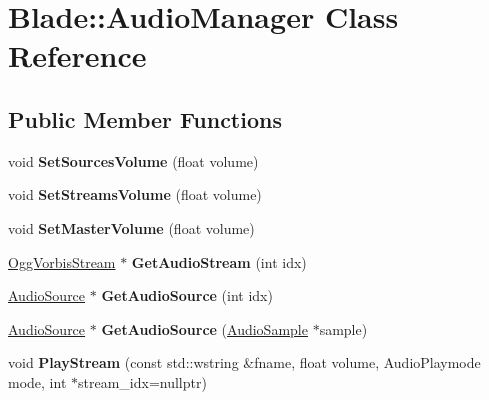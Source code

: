 \hypertarget{class_blade_1_1_audio_manager}{}\section{Blade\+:\+:Audio\+Manager Class Reference}
\label{class_blade_1_1_audio_manager}
\subsection*{Public Member Functions}
\begin{DoxyCompactItemize}
\item 
\mbox{\label{class_blade_1_1_audio_manager_a1106ccc2bbab55f49024eb5502d10683}} 
void {\bfseries Set\+Sources\+Volume} (float volume)
\item 
\mbox{\label{class_blade_1_1_audio_manager_a3d3199ddf491cc32f41e8d3252485176}} 
void {\bfseries Set\+Streams\+Volume} (float volume)
\item 
\mbox{\label{class_blade_1_1_audio_manager_acb30e9b4b523989514703d943e659f92}} 
void {\bfseries Set\+Master\+Volume} (float volume)
\item 
\mbox{\label{class_blade_1_1_audio_manager_abbea9e3d1d332c983b86d8a2eea926b4}} 
\hyperlink{class_blade_1_1_ogg_vorbis_stream}{Ogg\+Vorbis\+Stream} $\ast$ {\bfseries Get\+Audio\+Stream} (int idx)
\item 
\mbox{\label{class_blade_1_1_audio_manager_a3956140c9454c2d41adeaf5f0e15d455}} 
\hyperlink{class_blade_1_1_audio_source}{Audio\+Source} $\ast$ {\bfseries Get\+Audio\+Source} (int idx)
\item 
\mbox{\label{class_blade_1_1_audio_manager_af9e3f8dbd2f825a6166b35b275632d50}} 
\hyperlink{class_blade_1_1_audio_source}{Audio\+Source} $\ast$ {\bfseries Get\+Audio\+Source} (\hyperlink{class_blade_1_1_audio_sample}{Audio\+Sample} $\ast$sample)
\item 
\mbox{\label{class_blade_1_1_audio_manager_ac62793fe1189d24009b5e5d9e33d33b0}} 
void {\bfseries Play\+Stream} (const std\+::wstring \&fname, float volume, Audio\+Playmode mode, int $\ast$stream\+\_\+idx=nullptr)

\end{DoxyCompactItemize}
